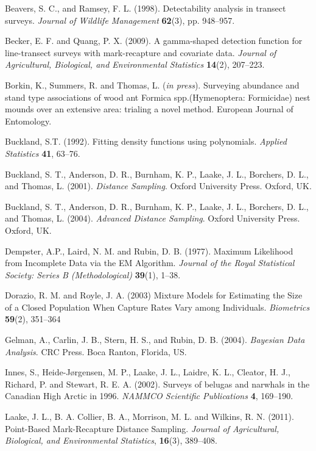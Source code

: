 \documentclass[useAMS,referee, usegraphicx]{biom}
\begin{document}
\begin{thebibliography}{}

\bibitem{ } Beavers, S. C., and Ramsey, F. L. (1998). Detectability analysis in transect surveys. \textit{Journal of Wildlife Management} \textbf{62}(3), pp. 948--957.

\bibitem{ } Becker, E. F. and Quang, P. X. (2009). A gamma-shaped detection function for line-transect surveys with mark-recapture and covariate data. \textit{Journal of Agricultural, Biological, and Environmental Statistics} \textbf{14}(2), 207--223.

\bibitem{ } Borkin, K., Summers, R. and Thomas, L. (\textit{in press}). Surveying abundance and stand type associations of wood ant Formica spp.(Hymenoptera: Formicidae) nest mounds over an extensive area: trialing a novel method. European Journal of Entomology.

\bibitem{ } Buckland, S.T. (1992). Fitting density functions using polynomials. \textit{Applied Statistics} \textbf{41}, 63--76. 

\bibitem{ }  Buckland, S. T., Anderson, D. R., Burnham, K. P., Laake, J. L., Borchers, D. L., and Thomas, L.  (2001). \textit{Distance Sampling}. Oxford University Press. Oxford, UK.

\bibitem{ }  Buckland, S. T., Anderson, D. R., Burnham, K. P., Laake, J. L., Borchers, D. L., and Thomas, L.  (2004). \textit{Advanced Distance Sampling}. Oxford University Press. Oxford, UK.

\bibitem{ } Dempster, A.P., Laird,  N. M. and Rubin, D. B. (1977). Maximum Likelihood from Incomplete Data via the EM Algorithm. \textit{Journal of the Royal Statistical Society: Series B (Methodological)} \textbf{39}(1), 1--38.

\bibitem{ } Dorazio, R. M. and Royle, J. A. (2003) Mixture Models for Estimating the Size of a Closed Population When Capture Rates Vary among Individuals. \textit{Biometrics} \textbf{59}(2), 351--364 

\bibitem{ }  Gelman, A., Carlin, J. B., Stern, H. S., and Rubin, D. B. (2004). \textit{Bayesian Data Analysis}. CRC Press. Boca Ranton, Florida, US.

\bibitem{ } Innes, S., Heide-J\o rgensen, M. P., Laake, J. L., Laidre, K. L., Cleator, H. J., Richard, P. and Stewart, R. E. A. (2002). Surveys of belugas and narwhals in the {C}anadian {H}igh {A}rctic in 1996. \textit{NAMMCO Scientific Publications} \textbf{4}, 169--190.

\bibitem{ } Laake, J. L., B. A. Collier, B. A., Morrison, M. L. and Wilkins, R. N. (2011). Point-Based Mark-Recapture Distance Sampling. \textit{Journal of Agricultural, Biological, and Environmental Statistics}, \textbf{16}(3), 389--408.


\end{thebibliography}
\end{document}
